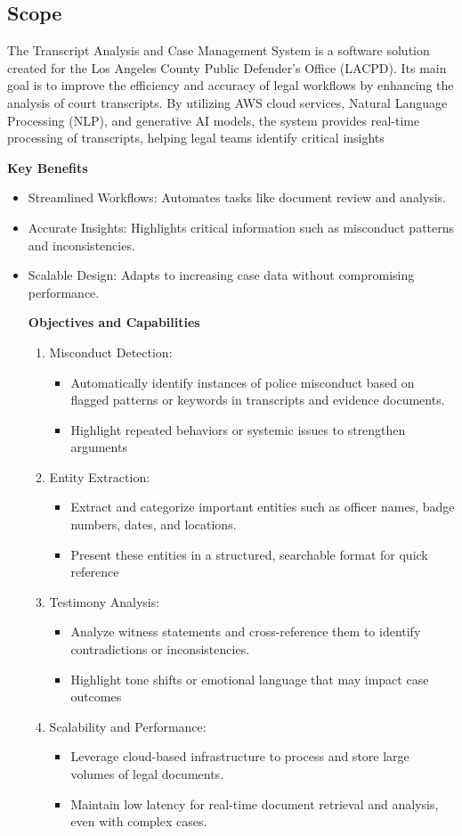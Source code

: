 \documentclass[12pt]{article}
\begin{document}
\subsection{Scope}
 The Transcript Analysis and Case Management System is a software solution created for
 the Los Angeles County Public Defender’s Office (LACPD). Its main goal is to improve the
 efficiency and accuracy of legal workflows by enhancing the analysis of court transcripts. By
 utilizing AWS cloud services, Natural Language Processing (NLP), and generative AI models,
 the system provides real-time processing of transcripts, helping legal teams identify critical
 insights

\textbf{Key Benefits }
\begin{itemize}
  \item  Streamlined Workflows: Automates tasks like document review and analysis.
  \item Accurate Insights: Highlights critical information such as misconduct patterns and
 inconsistencies.
  \item  Scalable Design: Adapts to increasing case data without compromising performance.

\textbf{Objectives and Capabilities }
\begin{enumerate}

    \item Misconduct Detection: 
	\begin{itemize}
	 	\item Automatically identify instances of police misconduct based on flagged patterns or
			 keywords in transcripts and evidence documents.
	 	\item  Highlight repeated behaviors or systemic issues to strengthen arguments
	\end{itemize}
    \item Entity  Extraction:
	\begin{itemize}
		 \item Extract and categorize important entities such as officer names, badge numbers, dates,
	 		and locations.
	 	\item Present these entities in a structured, searchable format for quick reference
	\end{itemize}
    \item Testimony Analysis:
	\begin{itemize}
		\item Analyze witness statements and cross-reference them to identify contradictions or
 			inconsistencies.
		\item  Highlight tone shifts or emotional language that may impact case outcomes
	\end{itemize}
    \item Scalability and Performance:
	\begin{itemize}
		\item  Leverage cloud-based infrastructure to process and store large volumes of legal
 			documents.
		\item Maintain low latency for real-time document retrieval and analysis, even with complex
  			cases.
	\end{itemize}
\end{enumerate}



\end{itemize}
\end{document}
